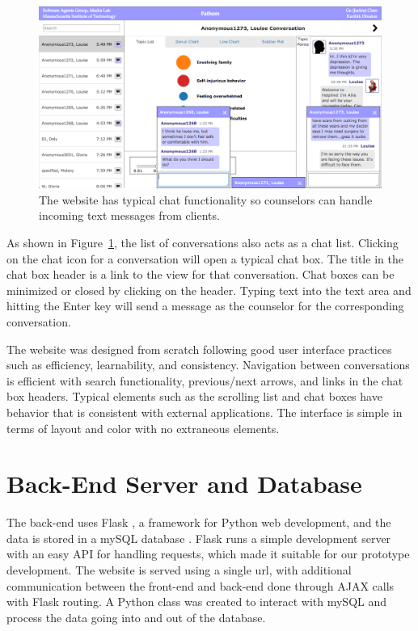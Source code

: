 \begin{figure}[h]
  \centering
    \includegraphics[width=\textwidth]{chatbox.png}
  \caption{The website has typical chat functionality so counselors can handle
  incoming text messages from clients.}
  \label{chatbox}
\end{figure}

As shown in Figure~\ref{chatbox}, the list of conversations also acts as a chat list. Clicking
on the chat icon for a conversation will open a typical chat box. The title in the chat
box header is a link to the view for that conversation. Chat boxes can be minimized
or closed by clicking on the header. Typing text into the text area and hitting the
Enter key will send a message as the counselor for the corresponding conversation.

The website was designed from scratch following good user interface practices
such as efficiency, learnability, and consistency. Navigation between conversations
is efficient with search functionality, previous/next arrows, and links in the chat box
headers. Typical elements such as the scrolling list and chat boxes have behavior that
is consistent with external applications. The interface is simple in terms of layout
and color with no extraneous elements.

\section{Back-End Server and Database}

The back-end uses Flask \cite{flask}, a framework for Python web development, and the data
is stored in a mySQL database \cite{mysql}. Flask runs a simple development server with an
easy API for handling requests, which made it suitable for our prototype development.
The website is served using a single url, with additional communication between the
front-end and back-end done through AJAX calls with Flask routing. A Python class
was created to interact with mySQL and process the data going into and out of the
database.


